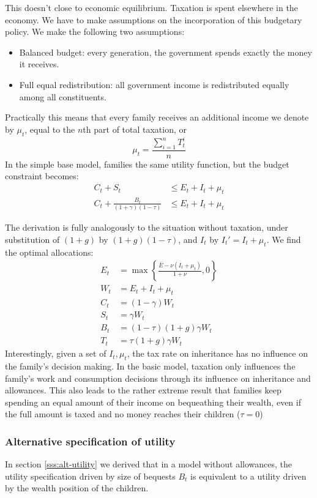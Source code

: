 This doesn't close to economic equilibrium. Taxation is spent elsewhere in the economy. We have to make assumptions on the incorporation of this budgetary policy. We make the following two assumptions:
\begin{itemize}
    \item Balanced budget: every generation, the government spends exactly the money it receives.
    \item Full equal redistribution: all government income is redistributed equally among all constituents.
\end{itemize}
Practically this means that every family receives an additional income we denote by $\mu_t$, equal to the $n$th part of total taxation, or
\begin{equation}
    \mu_t = \frac{\sum\limits_{i=1}^n T_t^i}{n}
\end{equation}
In the simple base model, families the same utility function, but the budget constraint becomes:
\begin{align}
    C_t + S_t &\leq E_t + I_t + \mu_t \\
    C_t + \frac{B_t}{(1+\gamma)(1-\tau)} &\leq E_t + I_t + \mu_t
\end{align}

The derivation is fully analogously to the situation without taxation, under substitution of $(1+g)$ by $(1+g)(1-\tau)$, and $I_t$ by $I_t' = I_t + \mu_t$. We find the optimal allocations:
\begin{align}
    E_t &= \max \left\{ \frac{\overline{E}-\nu (I_t+ \mu_t)}{1+\nu},0\right\}\\
    W_t &= E_t + I_t + \mu_t\\
    C_t &= (1-\gamma)W_t\\
    S_t &= \gamma W_t \\
    B_t &= (1-\tau)(1+g)\gamma W_t\\
    T_t &= \tau (1+g)\gamma W_t
\end{align}
Interestingly, given a set of $I_t, \mu_t$, the tax rate on inheritance has no influence on the family's decision making. In the basic model, taxation only influences the family's work and consumption decisions through its influence on inheritance and allowances. This also leads to the rather extreme result that families keep spending an equal amount of their income on bequeathing their wealth, even if the full amount is taxed and no money reaches their children ($\tau = 0$)

\subsubsection{Alternative specification of utility}
In section \ref{sss:alt-utility} we derived that in a model without allowances, the utility specification driven by size of bequests $B_t$ is equivalent to a utility driven by the wealth position of the children.

